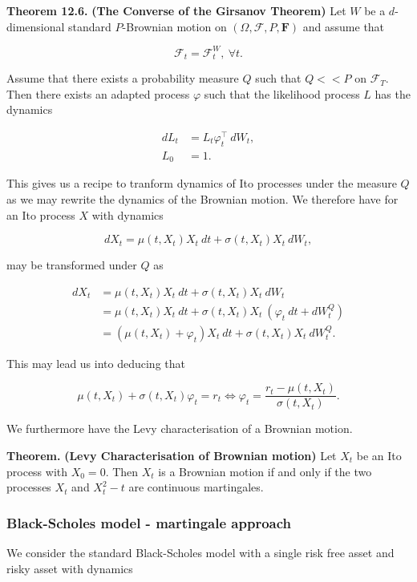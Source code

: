 \documentclass[
]{article}
\begin{document}
\textbf{Theorem 12.6.} \textbf{(The Converse of the Girsanov Theorem)}
Let \(W\) be a \(d\)-dimensional standard \(P\)-Brownian motion on
\((\Omega,\mathcal{F},P,\mathbf{F})\) and assume that

\[
\mathcal{F}_t=\mathcal{F}^W_t,\ \forall t.
\]

Assume that there exists a probability measure \(Q\) such that \(Q<<P\)
on \(\mathcal{F}_T\). Then there exists an adapted process \(\varphi\)
such that the likelihood process \(L\) has the dynamics

\begin{align*}
dL_t&=L_t\varphi^\top_t\ dW_t,\\
L_0&=1.
\end{align*}

This gives us a recipe to tranform dynamics of Ito processes under the
measure \(Q\) as we may rewrite the dynamics of the Brownian motion. We
therefore have for an Ito process \(X\) with dynamics

\[
dX_t=\mu(t,X_t)X_t\ dt+\sigma(t,X_t) X_t\ dW_t,
\]

may be transformed under \(Q\) as

\begin{align*}
dX_t&=\mu(t,X_t)X_t\ dt+\sigma(t,X_t) X_t\ dW_t\\
&=\mu(t,X_t)X_t\ dt+\sigma(t,X_t) X_t\ (\varphi_t\ dt+dW_t^Q)\\
&=\left(\mu(t,X_t) + \varphi_t\right) X_t\ dt + \sigma(t,X_t)X_t\ dW_t^Q.
\end{align*}

This may lead us into deducing that

\[
\mu(t,X_t)+\sigma(t,X_t)\varphi_t=r_t\iff\varphi_t=\frac{r_t-\mu(t,X_t)}{\sigma(t,X_t)}.
\]

We furthermore have the Levy characterisation of a Brownian motion.

\textbf{Theorem.} \textbf{(Levy Characterisation of Brownian motion)}
Let \(X_t\) be an Ito process with \(X_0=0\). Then \(X_t\) is a Brownian
motion if and only if the two processes \(X_t\) and \(X_t^2-t\) are
continuous martingales.

\hypertarget{black-scholes-model---martingale-approach}{%
\subsubsection{Black-Scholes model - martingale
approach}\label{black-scholes-model---martingale-approach}}

We consider the standard Black-Scholes model with a single risk free
asset and risky asset with dynamics
\end{document}
